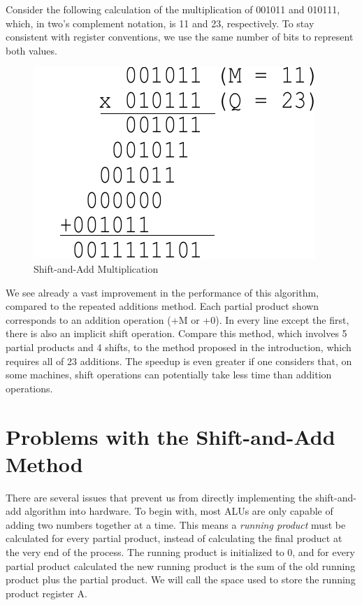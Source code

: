 \documentclass{article}
\begin{document}
Consider the following calculation of the multiplication of 001011 and 010111, which, in two's complement notation, is 11 and 23, respectively.
To stay consistent with register conventions, we use the same number of bits to represent both values.
\pagebreak
\begin{figure}
\centering
\includegraphics[scale=0.7]{saam3.pdf}
\caption{Shift-and-Add Multiplication}
\end{figure}

We see already a vast improvement in the performance of this algorithm, compared to the repeated additions method.
Each partial product shown corresponds to an addition operation (+M or +0).
In every line except the first, there is also an implicit shift operation.
Compare this method, which involves 5 partial products and 4 shifts, to the method proposed in the introduction, which requires all of 23 additions.
The speedup is even greater if one considers that, on some machines, shift operations can potentially take less time than addition operations.

\section{Problems with the Shift-and-Add Method}
There are several issues that prevent us from directly implementing the shift-and-add algorithm into hardware.
To begin with, most ALUs are only capable of adding two numbers together at a time.
This means a \emph{running product} must be calculated for every partial product, instead of calculating the final product at the very end of the process.
The running product is initialized to 0, and for every partial product calculated the new running product is the sum of the old running product plus the partial product.
We will call the space used to store the running product register A.
\end{document}
